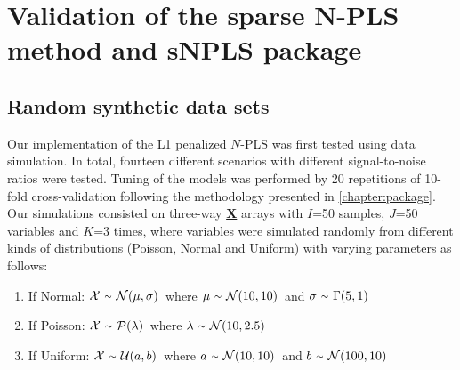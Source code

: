 
\chapter[Validation of the sparse N-PLS method and sNPLS package]{Validation of the sparse N-PLS method and sNPLS package}



\section{Random synthetic data sets}
Our implementation of the L1 penalized $N$-PLS was first tested using data simulation. In total, fourteen different scenarios with different signal-to-noise ratios were tested. Tuning of the models was performed by 20 repetitions of 10-fold cross-validation following the methodology presented in \autoref{chapter:package}. Our simulations consisted on three-way \textbf{\underline{X}} arrays with $I$=50 samples, $J$=50 variables and $K$=3 times, where variables were simulated randomly from different kinds of distributions (Poisson, Normal and Uniform) with varying parameters as follows:

\begin{enumerate}
    \item If Normal: $\mathcal{X}\ {\raise.17ex\hbox{$\scriptstyle\sim$}}\ \mathcal{N}(\mu, \sigma)$\ where $\mu\ {\raise.17ex\hbox{$\scriptstyle\sim$}}\ \mathcal{N}(10, 10)$\ and $\sigma\ {\raise.17ex\hbox{$\scriptstyle\sim$}}\ \Gamma(5, 1)$
    \item If Poisson: $\mathcal{X}\ {\raise.17ex\hbox{$\scriptstyle\sim$}}\ \mathcal{P}(\lambda)$\ where $\lambda\ {\raise.17ex\hbox{$\scriptstyle\sim$}}\ \mathcal{N}(10, 2.5)$
    \item If Uniform: $\mathcal{X}\ {\raise.17ex\hbox{$\scriptstyle\sim$}}\ \mathcal{U}(a, b)$\ where $a\ {\raise.17ex\hbox{$\scriptstyle\sim$}}\ \mathcal{N}(10, 10)$\ and $b\ {\raise.17ex\hbox{$\scriptstyle\sim$}}\ \mathcal{N}(100, 10)$
\end{enumerate}

